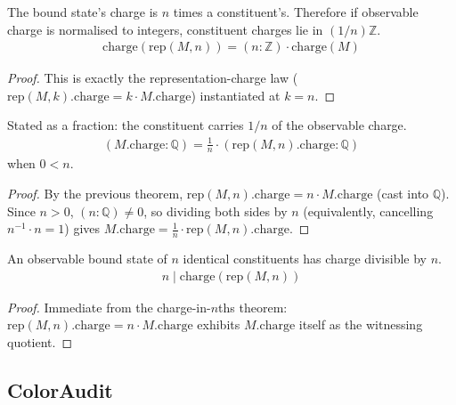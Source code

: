 \begin{theorem}
The bound state's charge is $n$ times a constituent's.  Therefore if observable charge is normalised to integers, constituent charges lie in $(1/n)\mathbb{Z}$.
\begin{align*}
\text{charge}(\text{rep}(M, n)) = (n : \mathbb{Z}) \cdot \text{charge}(M)
\end{align*}
\begin{proof}
This is exactly the representation-charge law ($\text{rep}(M,k).\text{charge} = k\cdot M.\text{charge}$) instantiated at $k=n$.
\end{proof}
\end{theorem}

\begin{theorem}
Stated as a fraction: the constituent carries $1/n$ of the observable charge.
\begin{align*}
(M.\text{charge} : \mathbb{Q}) = \frac{1}{n} \cdot (\text{rep}(M, n).\text{charge} : \mathbb{Q})
\end{align*}
when $0 < n$.
\begin{proof}
By the previous theorem, $\text{rep}(M,n).\text{charge} = n\cdot M.\text{charge}$
(cast into $\mathbb{Q}$). Since $n>0$, $(n:\mathbb{Q})\neq0$, so dividing both
sides by $n$ (equivalently, cancelling $n^{-1}\cdot n=1$) gives
$M.\text{charge} = \tfrac1n\cdot\text{rep}(M,n).\text{charge}$.
\end{proof}
\end{theorem}

\begin{theorem}
An observable bound state of $n$ identical constituents has charge divisible by $n$.
\begin{align*}
n \mid \text{charge}(\text{rep}(M, n))
\end{align*}
\begin{proof}
Immediate from the charge-in-$n$ths theorem: $\text{rep}(M,n).\text{charge} = n\cdot M.\text{charge}$ exhibits $M.\text{charge}$ itself as the witnessing quotient.
\end{proof}
\end{theorem}

\subsection{ColorAudit}

